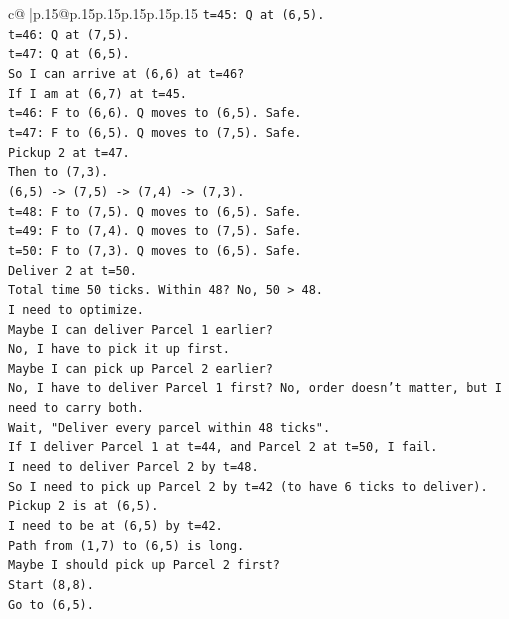 \documentclass{article}
\begin{document}
{\begin{supertabular}{c@{$\;$}|p{.15\linewidth}@{}p{.15\linewidth}p{.15\linewidth}p{.15\linewidth}p{.15\linewidth}p{.15\linewidth}}
{{{\texttt{t=45: Q at (6,5).} \\
\texttt{t=46: Q at (7,5).} \\
\texttt{t=47: Q at (6,5).} \\
\texttt{So I can arrive at (6,6) at t=46?} \\
\texttt{If I am at (6,7) at t=45.} \\
\texttt{t=46: F to (6,6). Q moves to (6,5). Safe.} \\
\texttt{t=47: F to (6,5). Q moves to (7,5). Safe.} \\
\texttt{Pickup 2 at t=47.} \\
\texttt{Then to (7,3).} \\
\texttt{(6,5) {-}> (7,5) {-}> (7,4) {-}> (7,3).} \\
\texttt{t=48: F to (7,5). Q moves to (6,5). Safe.} \\
\texttt{t=49: F to (7,4). Q moves to (7,5). Safe.} \\
\texttt{t=50: F to (7,3). Q moves to (6,5). Safe.} \\
\texttt{Deliver 2 at t=50.} \\
\texttt{Total time 50 ticks. Within 48? No, 50 > 48.} \\
\texttt{I need to optimize.} \\
\texttt{Maybe I can deliver Parcel 1 earlier?} \\
\texttt{No, I have to pick it up first.} \\
\texttt{Maybe I can pick up Parcel 2 earlier?} \\
\texttt{No, I have to deliver Parcel 1 first? No, order doesn't matter, but I need to carry both.} \\
\texttt{Wait, "Deliver every parcel within 48 ticks".} \\
\texttt{If I deliver Parcel 1 at t=44, and Parcel 2 at t=50, I fail.} \\
\texttt{I need to deliver Parcel 2 by t=48.} \\
\texttt{So I need to pick up Parcel 2 by t=42 (to have 6 ticks to deliver).} \\
\texttt{Pickup 2 is at (6,5).} \\
\texttt{I need to be at (6,5) by t=42.} \\
\texttt{Path from (1,7) to (6,5) is long.} \\
\texttt{Maybe I should pick up Parcel 2 first?} \\
\texttt{Start (8,8).} \\
\texttt{Go to (6,5).} \\
}}}
\end{supertabular}}
\end{document}
